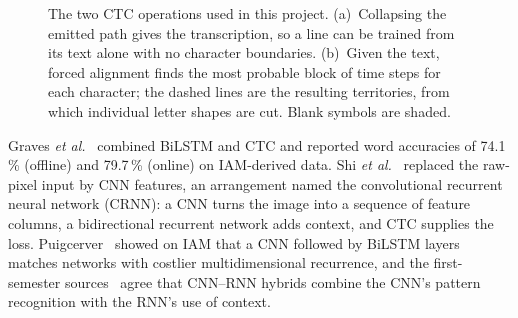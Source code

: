 \begin{figure}[htbp]
\centering
{}
\caption{The two CTC operations used in this project. (a)~Collapsing the emitted path gives the transcription, so a line can be trained from its text alone with no character boundaries. (b)~Given the text, forced alignment finds the most probable block of time steps for each character; the dashed lines are the resulting territories, from which individual letter shapes are cut. Blank symbols are shaded.}
\label{fig:lit-ctc}
\end{figure}

Graves \emph{et al.}~\cite{graves2009} combined BiLSTM and CTC and reported word accuracies of 74.1\,\% (offline) and 79.7\,\% (online) on IAM-derived data. Shi \emph{et al.}~\cite{shi2017} replaced the raw-pixel input by CNN features, an arrangement named the convolutional recurrent neural network (CRNN): a CNN turns the image into a sequence of feature columns, a bidirectional recurrent network adds context, and CTC supplies the loss. Puigcerver~\cite{puigcerver2017} showed on IAM that a CNN followed by BiLSTM layers matches networks with costlier multidimensional recurrence, and the first-semester sources~\cite{ma2023,kumar2024,hemanth2022} agree that CNN--RNN hybrids combine the CNN's pattern recognition with the RNN's use of context.

